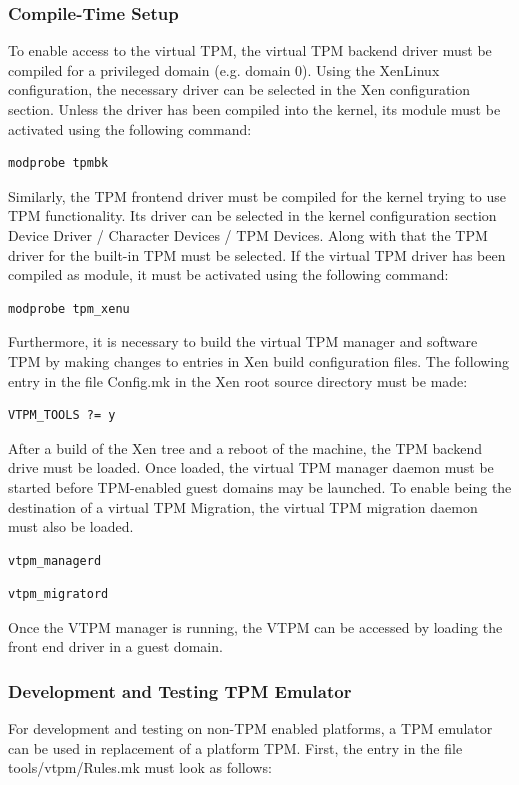 \documentclass[11pt,twoside,final,openright]{report}
\begin{document}
\subsubsection{Compile-Time Setup}
To enable access to the virtual TPM, the virtual TPM backend driver must
be compiled for a privileged domain (e.g. domain 0). Using the XenLinux
configuration, the necessary driver can be selected in the Xen configuration
section. Unless the driver has been compiled into the kernel, its module
must be activated using the following command:

\begin{verbatim}
modprobe tpmbk
\end{verbatim}

Similarly, the TPM frontend driver must be compiled for the kernel trying
to use TPM functionality. Its driver can be selected in the kernel
configuration section Device Driver / Character Devices / TPM Devices.
Along with that the TPM driver for the built-in TPM must be selected.
If the virtual TPM driver has been compiled as module, it
must be activated using the following command:

\begin{verbatim}
modprobe tpm_xenu
\end{verbatim}

Furthermore, it is necessary to build the virtual TPM manager and software
TPM by making changes to entries in Xen build configuration files.
The following entry in the file Config.mk in the Xen root source
directory must be made:

\begin{verbatim}
VTPM_TOOLS ?= y
\end{verbatim}

After a build of the Xen tree and a reboot of the machine, the TPM backend
drive must be loaded. Once loaded, the virtual TPM manager daemon
must be started before TPM-enabled guest domains may be launched.
To enable being the destination of a virtual TPM Migration, the virtual TPM
migration daemon must also be loaded.

\begin{verbatim}
vtpm_managerd
\end{verbatim}
\begin{verbatim}
vtpm_migratord
\end{verbatim}

Once the VTPM manager is running, the VTPM can be accessed by loading the
front end driver in a guest domain.

\subsubsection{Development and Testing TPM Emulator}
For development and testing on non-TPM enabled platforms, a TPM emulator
can be used in replacement of a platform TPM. First, the entry in the file
tools/vtpm/Rules.mk must look as follows:
\end{document}
